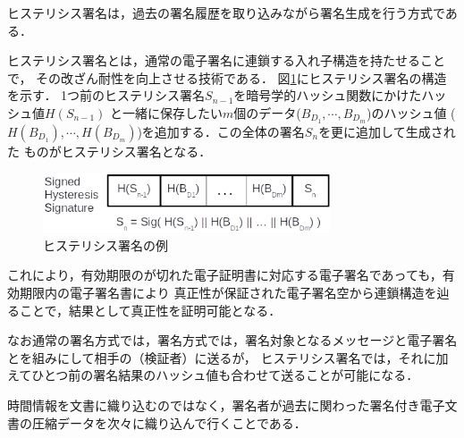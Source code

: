 \documentclass[a4paper,12pt]{jsarticle}
\begin{document}
ヒステリシス署名は，過去の署名履歴を取り込みながら署名生成を行う方式である．

ヒステリシス署名\cite{suzaki}とは，通常の電子署名に連鎖する入れ子構造を持たせることで，
その改ざん耐性を向上させる技術である．
図\ref{fig:hysteresis}にヒステリシス署名の構造を示す．
1つ前のヒステリシス署名$S_{n-1}$を暗号学的ハッシュ関数にかけたハッシュ値$H(S_{n-1})$
と一緒に保存したい$m$個のデータ($B_{D_1}, \cdots, B_{D_m}$)のハッシュ値
($H(B_{D_1}), \cdots, H(B_{D_m})$)を追加する．この全体の署名$S_n$を更に追加して生成された
ものがヒステリシス署名となる．

\begin{figure}[tbh]
  \begin{center}
    \includegraphics[width=85mm]{pht/hysteresis_signature.eps}
  \end{center}
  \caption{ヒステリシス署名の例}
  \label{fig:hysteresis}
\end{figure}


これにより，有効期限のが切れた電子証明書に対応する電子署名であっても，有効期限内の電子署名書により
真正性が保証された電子署名空から連鎖構造を辿ることで，結果として真正性を証明可能となる．

なお通常の署名方式では，署名方式では，署名対象となるメッセージと電子署名とを組みにして相手の（検証者）に送るが，
ヒステリシス署名では，それに加えてひとつ前の署名結果のハッシュ値も合わせて送ることが可能になる．

時間情報を文書に織り込むのではなく，署名者が過去に関わった署名付き電子文書の圧縮データを次々に織り込んで行くことである．



\end{document}

